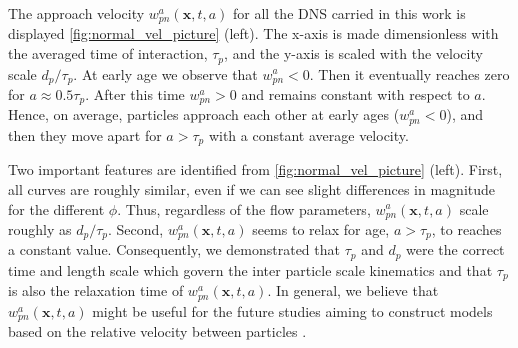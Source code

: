 The approach velocity $w_{pn}^a(\textbf{x},t,a)$ for all the DNS carried in this work is displayed \ref{fig:normal_vel_picture} (left). 
The x-axis is made dimensionless with the averaged time of interaction, $\tau_p$, and the y-axis is scaled with the velocity scale $d_p /\tau_p$. 
At  early age we observe that $w_{pn}^a<0$.
Then it eventually reaches zero for  $a \approx 0.5\tau_p$.
After this time $w_{pn}^a>0$ and remains constant with respect to $a$. 
Hence, on average, particles approach each other at early ages ($w_{pn}^a<0$), and then they move apart for $a > \tau_p$ with a constant average velocity.

Two important features are identified from \ref{fig:normal_vel_picture} (left).
First, all curves are roughly similar, even if we can see slight differences in magnitude for the different $\phi$. 
Thus, regardless of the flow parameters, $w_{pn}^a(\textbf{x},t,a)$ scale roughly as $d_p /\tau_p$. 
Second,  $w_{pn}^a(\textbf{x},t,a)$ seems to relax for age, $a > \tau_p$, to reaches a constant value. 
Consequently, we demonstrated that $\tau_p$ and $d_p$ were the correct time and length scale which govern the inter particle scale kinematics   and that $\tau_p$ is also the relaxation time of $w_{pn}^a(\textbf{x},t,a)$. 
In general, we believe that $w_{pn}^a(\textbf{x},t,a)$ might be useful for the future studies aiming to construct models based on the relative velocity between particles \citep{rao2008introduction}. 

